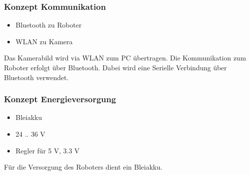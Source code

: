 \subsubsection{Konzept Kommunikation}
\begin{itemize}
    \item Bluetooth zu Roboter
    \item WLAN zu Kamera
\end{itemize}
Das Kamerabild wird via WLAN zum PC übertragen. Die Kommunikation zum Roboter 
erfolgt über Bluetooth. Dabei wird eine Serielle Verbindung über Bluetooth 
verwendet. 


\subsubsection{Konzept Energieversorgung}
\begin{itemize}
    \item Bleiakku
    \item 24 .. 36 V
    \item Regler für 5 V, 3.3 V
\end{itemize}
Für die Versorgung des Roboters dient ein Bleiakku. 
